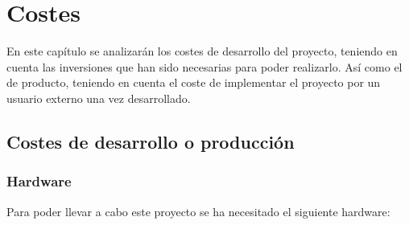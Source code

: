\chapter{Costes}
En este capítulo se analizarán los costes de desarrollo del proyecto, teniendo
en cuenta las inversiones que han sido necesarias para poder realizarlo. Así
como el de producto, teniendo en cuenta el coste de implementar el
proyecto por un usuario externo una vez desarrollado.

\section{Costes de desarrollo o producción}

\subsection{Hardware}

Para poder llevar a cabo este proyecto se ha necesitado el siguiente hardware:

